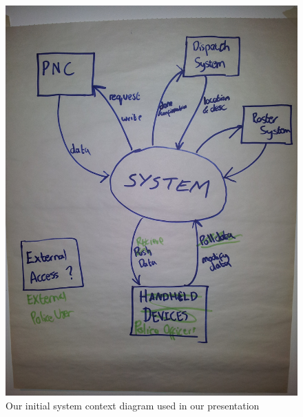 \documentclass[12pt]{article} %
\begin{document}
\begin{figure}
\begin{center}
\includegraphics[width=\linewidth, angle=-90]{dia1}
\parbox{0.90\linewidth}{\caption{Our initial system context diagram used in our presentation}}
\end{center}
\end{figure}
\end{document}
